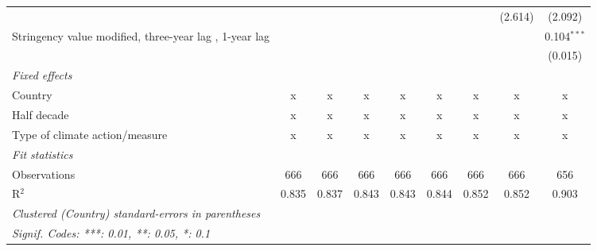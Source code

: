 \begin{table}[htbp]
\begin{tabular}{lcccccccc}
                                                                                                 &         &               &               &               &               &                & (2.614)        & (2.092)\\   
      Stringency value modified, three-year lag , 1-year lag                                     &         &               &               &               &               &                &                & 0.104$^{***}$\\   
                                                                                                 &         &               &               &               &               &                &                & (0.015)\\   
      \emph{Fixed effects}\\
      Country                                                                                    & x       & x             & x             & x             & x             & x              & x              & x\\  
      Half decade                                                                                & x       & x             & x             & x             & x             & x              & x              & x\\  
      Type of climate action/measure                                                             & x       & x             & x             & x             & x             & x              & x              & x\\  
      \midrule \emph{Fit statistics}\\
      Observations                                                                               & 666     & 666           & 666           & 666           & 666           & 666            & 666            & 656\\  
      R$^2$                                                                                      & 0.835   & 0.837         & 0.843         & 0.843         & 0.844         & 0.852          & 0.852          & 0.903\\  
      \midrule
      \multicolumn{9}{l}{\emph{Clustered (Country) standard-errors in parentheses}}\\
      \multicolumn{9}{l}{\emph{Signif. Codes: ***: 0.01, **: 0.05, *: 0.1}}\\
   \end{tabular}
\end{table}


